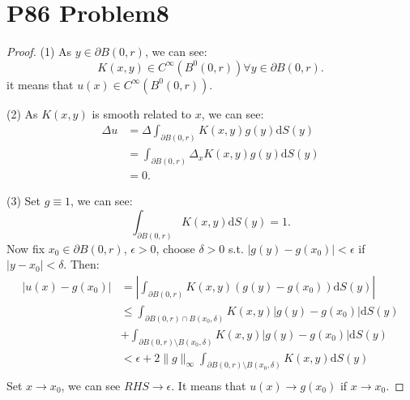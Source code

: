 \documentclass[a4paper]{ctexart}
\newcommand{\dif}{\mathrm{d}}
\begin{document}
\section*{P86 Problem8}
\begin{proof}
    (1) As $y\in\partial B(0,r)$, we can see:
    $$
    K(x,y)\in C^{\infty}(B^{0}(0,r))\forall y\in\partial B(0,r).
    $$
    it means that $u(x)\in C^{\infty}(B^{0}(0,r))$.

    (2) As $K(x,y)$ is smooth related to $x$, we can see:
    \begin{equation}
        \begin{aligned}
            \Delta u&=\Delta\int_{\partial B(0,r)}K(x,y)g(y)\dif S(y)\\
            &=\int_{\partial B(0,r)}\Delta_{x}K(x,y)g(y)\dif S(y)\\
            &=0.
        \end{aligned}
    \end{equation}

    (3) Set $g\equiv 1$, we can see:
    \begin{equation}
        \int_{\partial B(0,r)}K(x,y)\dif S(y)=1.
    \end{equation}
    Now fix $x_{0}\in\partial B(0,r)$, $\epsilon>0$, choose $\delta>0$ s.t. $|g(y)-g(x_{0})|<\epsilon$ 
    if $|y-x_{0}|<\delta$. Then:
    \begin{equation}
        \begin{aligned}
            |u(x)-g(x_{0})|&=|\int_{\partial B(0,r)}K(x,y)(g(y)-g(x_{0}))\dif S(y)|\\
            &\le\int_{\partial B(0,r)\cap B(x_{0},\delta)}K(x,y)|g(y)-g(x_{0})|\dif S(y)\\
            &+\int_{\partial B(0,r)\setminus B(x_{0},\delta)}K(x,y)|g(y)-g(x_{0})|\dif S(y)\\
            &<\epsilon+2\|g\|_{\infty}\int_{\partial B(0,r)\setminus B(x_{0},\delta)}K(x,y)\dif S(y)\\
        \end{aligned}
    \end{equation}
    Set $x\rightarrow x_{0}$, we can see $RHS\rightarrow \epsilon$. It means that $u(x)\rightarrow g(x_{0})$ 
    if $x\rightarrow x_{0}$. 
\end{proof}
\end{document}
